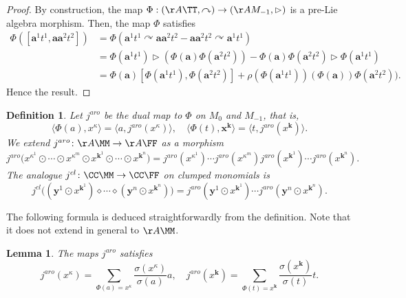\documentclass[a4paper,11pt]{article}
\newtheorem{definition}[theorem]{Definition}
\newtheorem{lemma}[theorem]{Lemma}
\begin{document}
\begin{proof}
By construction, the map $\Phi: (\AA\TT, \curvearrowright) \rightarrow (\AA M_{-1},\rhd)$ is a pre-Lie algebra morphism.
Then, the map $\Phi$ satisfies
\begin{align*}
\Phi([\mathbf{a}^1t^1, \mathbf{a}\mathbf{a}^2 t^2])
&= \Phi(\mathbf{a}^1t^1\curvearrowright \mathbf{a}\mathbf{a}^2 t^2-\mathbf{a}\mathbf{a}^2 t^2\curvearrowright \mathbf{a}^1t^1)\\
&= \Phi(\mathbf{a}^1t^1)\rhd (\Phi(\mathbf{a})\Phi(\mathbf{a}^2 t^2))-\Phi(\mathbf{a})\Phi(\mathbf{a}^2 t^2)\rhd \Phi(\mathbf{a}^1t^1)\\
&= \Phi(\mathbf{a}) [\Phi(\mathbf{a}^1t^1), \Phi(\mathbf{a}^2 t^2)]
+\rho(\Phi(\mathbf{a}^1t^1))(\Phi(\mathbf{a})) \Phi(\mathbf{a}^2 t^2)).
\end{align*}
Hence the result.
\end{proof}



\begin{definition}
Let $j^{aro}$ be the dual map to $\Phi$ on $M_0$ and $M_{-1}$, that is,
\[
\langle \Phi(a), x^\kappa \rangle = \langle a, j^{aro}( x^\kappa ) \rangle,\quad
\langle \Phi(t), \mathbf x^{\mathbf k} \rangle = \langle t, j^{aro}( x^{\mathbf k}) \rangle.
\]
We extend $j^{aro}\colon \AA\MM\rightarrow\AA\FF$ as a morphism
\[
j^{aro}\big(x^{\kappa^1}\odot\cdots \odot x^{\kappa^m}\odot x^{\mathbf k^1}\odot\cdots \odot x^{\mathbf k^n}\big) = j^{aro}(x^{\kappa^1})\cdots j^{aro}(x^{\kappa^m}) j^{aro}(x^{\mathbf k^1}) \cdots j^{aro}(x^{\mathbf k^n}).
\]
The analogue $j^{cl}\colon \CC\MM\rightarrow\CC\FF$ on clumped monomials is
\[
j^{cl}\big((\mathbf{y}^1\odot  x^{\mathbf k^1})\diamond\cdots \diamond (\mathbf{y}^n\odot x^{\mathbf k^n})\big)=j^{aro}(\mathbf{y}^1 \odot x^{\mathbf k^1})\cdots j^{aro}(\mathbf{y}^n\odot x^{\mathbf k^n}). 
\]
\end{definition}


The following formula is deduced straightforwardly from the definition. Note that it does not extend in general to $\AA\MM$.
\begin{lemma}
The maps $j^{aro}$ satisfies
\begin{equation}\label{formulajaro}
j^{aro}(x^{\kappa}) = \sum_{\Phi(a)= x^{\kappa}} \frac{\sigma(x^{\kappa})}{\sigma(a)}a,\quad
j^{aro}(x^{\mathbf{k}}) = \sum_{\Phi(t)= x^{\mathbf{k}}} \frac{\sigma(x^{\mathbf{k}})}{\sigma(t)}t.
\end{equation}
\end{lemma}
\end{document}
